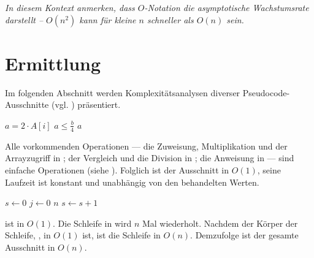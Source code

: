 \emph{In diesem Kontext anmerken, dass $O$-Notation die \emph{asymptotische Wachstumsrate} darstellt -- $O(n^2)$ kann für kleine $n$ schneller als $O(n)$ sein.}





\section{Ermittlung}
\label{sec:te-ermittlung}

Im folgenden Abschnitt werden Komplexitätsanalysen diverser Pseudocode-Ausschnitte (vgl. \cite[69ff]{sha2011}) präsentiert.

\begin{codebox}
    \li $a = 2 \cdot A[i]$          \label{ln:ex1-setup}
    \li \If $a \leq \frac{b}{4}$    \label{ln:ex1-if}
    \li     \Then
                \Return $a$         \label{ln:ex1-return}
            \End
\end{codebox}

Alle vorkommenden Operationen --- die Zuweisung, Multiplikation und der Arrayzugriff in ; der Vergleich und die Division in ; die \Return Anweisung in  --- sind einfache Operationen (siehe ). Folglich ist der Ausschnitt in $O(1)$, seine Laufzeit ist konstant und unabhängig von den behandelten Werten.

\begin{codebox}
    \li $s \gets 0$                 \label{ln:ex2-outer-assignment}
    \li \For $j \gets 0$ \To $n$    \label{ln:ex2-for}
    \li     \Do
                $s \gets s + 1$     \label{ln:ex2-inner-assignment}
            \End
\end{codebox}

 ist in $O(1)$. Die \For Schleife in  wird $n$ Mal wiederholt. Nachdem der Körper der Schleife, , in $O(1)$ ist, ist die Schleife in $O(n)$. Demzufolge ist der gesamte Ausschnitt in $O(n)$.


